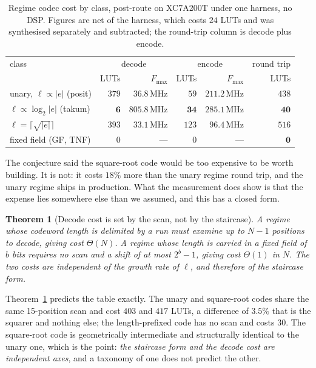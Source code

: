 \documentclass[11pt]{article}
\newtheorem{theorem}{Theorem}
\theoremstyle{definition}
\begin{document}
\begin{table}[t]\centering
\caption{Regime codec cost by class, post-route on XC7A200T under one harness,
no DSP. Figures are net of the harness, which costs $24$ LUTs and was synthesised
separately and subtracted; the round-trip column is decode plus encode.}
\label{tab:regimecost}
\begin{tabular}{lrrrrr}
\toprule
class & \multicolumn{2}{c}{decode} & \multicolumn{2}{c}{encode} & round trip \\
      & LUTs & $F_{\max}$ & LUTs & $F_{\max}$ & LUTs \\
\midrule
unary, $\ell \propto |e|$ (posit)          & $379$ & $36.8$\,MHz  & $59$  & $211.2$\,MHz & $438$ \\
$\ell \propto \log_2|e|$ (takum)           & $\mathbf{6}$ & $\mathbf{805.8}$\,MHz & $\mathbf{34}$ & $\mathbf{285.1}$\,MHz & $\mathbf{40}$ \\
$\ell = \lceil\sqrt{|e|}\rceil$            & $393$ & $33.1$\,MHz  & $123$ & $96.4$\,MHz  & $516$ \\
\midrule
fixed field (GF, TNF)                     & $0$   & ---          & $0$   & ---          & $\mathbf{0}$ \\
\bottomrule
\end{tabular}
\end{table}

The conjecture said the square-root code would be too expensive to be worth
building. It is not: it costs $18\%$ more than the unary regime round trip, and
the unary regime ships in production. What the measurement does show is that the
expense lies somewhere else than we assumed, and this has a closed form.

\begin{theorem}[Decode cost is set by the scan, not by the staircase]
\label{thm:scan}
A regime whose codeword length is delimited by a run must examine up to $N-1$
positions to decode, giving cost $\Theta(N)$. A regime whose length is carried in
a fixed field of $b$ bits requires no scan and a shift of at most $2^{b}-1$,
giving cost $\Theta(1)$ in $N$. The two costs are independent of the growth rate
of $\ell$, and therefore of the staircase form.
\end{theorem}

Theorem~\ref{thm:scan} predicts the table exactly. The unary and square-root codes
share the same 15-position scan and cost $403$ and $417$ LUTs, a difference of
$3.5\%$ that is the squarer and nothing else; the length-prefixed code has no scan
and costs $30$. The square-root code is geometrically intermediate and structurally
identical to the unary one, which is the point: \emph{the staircase form and the
decode cost are independent axes}, and a taxonomy of one does not predict the
other.
\end{document}
